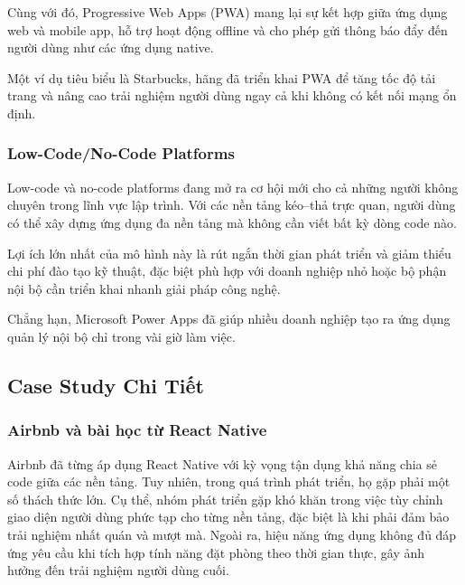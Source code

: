 \vspace{0.5em}

Cùng với đó, Progressive Web Apps (PWA) mang lại sự kết hợp giữa ứng dụng web và mobile app,  
hỗ trợ hoạt động offline và cho phép gửi thông báo đẩy đến người dùng như các ứng dụng native.

\vspace{0.5em}

Một ví dụ tiêu biểu là Starbucks, hãng đã triển khai PWA để tăng tốc độ tải trang và nâng cao trải nghiệm người dùng ngay cả khi không có kết nối mạng ổn định.


\subsubsection{Low-Code/No-Code Platforms}

Low-code và no-code platforms đang mở ra cơ hội mới cho cả những người không chuyên trong lĩnh vực lập trình. Với các nền tảng kéo–thả trực quan, người dùng có thể xây dựng ứng dụng đa nền tảng mà không cần viết bất kỳ dòng code nào.

\vspace{0.5em}

Lợi ích lớn nhất của mô hình này là rút ngắn thời gian phát triển và giảm thiểu chi phí đào tạo kỹ thuật, đặc biệt phù hợp với doanh nghiệp nhỏ hoặc bộ phận nội bộ cần triển khai nhanh giải pháp công nghệ.

\vspace{0.5em}

Chẳng hạn, Microsoft Power Apps đã giúp nhiều doanh nghiệp tạo ra ứng dụng quản lý nội bộ chỉ trong vài giờ làm việc.


\subsection{Case Study Chi Tiết}
\renewcommand{\labelitemi}{--}

\subsubsection{Airbnb và bài học từ React Native}

Airbnb đã từng áp dụng React Native với kỳ vọng tận dụng khả năng chia sẻ code giữa các nền tảng.  
Tuy nhiên, trong quá trình phát triển, họ gặp phải một số thách thức lớn. Cụ thể, nhóm phát triển gặp khó khăn trong việc tùy chỉnh giao diện người dùng phức tạp cho từng nền tảng, đặc biệt là khi phải đảm bảo trải nghiệm nhất quán và mượt mà. Ngoài ra, hiệu năng ứng dụng không đủ đáp ứng yêu cầu khi tích hợp tính năng đặt phòng theo thời gian thực, gây ảnh hưởng đến trải nghiệm người dùng cuối.

